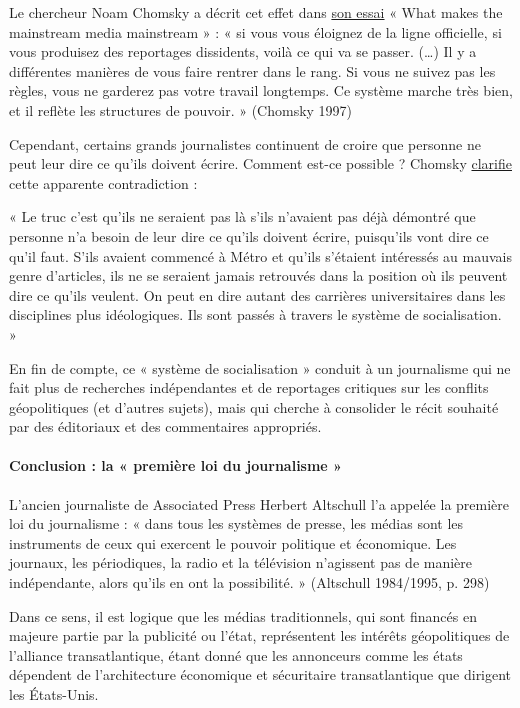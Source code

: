Le chercheur Noam Chomsky a décrit cet effet dans
\href{https://chomsky.info/199710__/}{son essai} « What makes the
mainstream media mainstream » : « si vous vous éloignez de la ligne
officielle, si vous produisez des reportages dissidents, voilà ce qui va
se passer. (\ldots{}) Il y a différentes manières de vous faire rentrer
dans le rang. Si vous ne suivez pas les règles, vous ne garderez pas
votre travail longtemps. Ce système marche très bien, et il reflète les
structures de pouvoir. » (Chomsky 1997)

Cependant, certains grands journalistes continuent de croire que
personne ne peut leur dire ce qu'ils doivent écrire. Comment est-ce
possible ? Chomsky \href{https://chomsky.info/199710__/}{clarifie} cette
apparente contradiction :

« Le truc c'est qu'ils ne seraient pas là s'ils n'avaient pas déjà
démontré que personne n'a besoin de leur dire ce qu'ils doivent écrire,
puisqu'ils vont dire ce qu'il faut. S'ils avaient commencé à Métro et
qu'ils s'étaient intéressés au mauvais genre d'articles, ils ne se
seraient jamais retrouvés dans la position où ils peuvent dire ce qu'ils
veulent. On peut en dire autant des carrières universitaires dans les
disciplines plus idéologiques. Ils sont passés à travers le système de
socialisation. »

En fin de compte, ce « système de socialisation » conduit à un
journalisme qui ne fait plus de recherches indépendantes et de
reportages critiques sur les conflits géopolitiques (et d'autres
sujets), mais qui cherche à consolider le récit souhaité par des
éditoriaux et des commentaires appropriés.

\hypertarget{conclusion--la--premiuxe8re-loi-du-journalisme-}{%
\paragraph{Conclusion : la « première loi du journalisme
»}\label{conclusion--la--premiuxe8re-loi-du-journalisme-}}

L'ancien journaliste de Associated Press Herbert Altschull l'a appelée
la première loi du journalisme : « dans tous les systèmes de presse, les
médias sont les instruments de ceux qui exercent le pouvoir politique et
économique. Les journaux, les périodiques, la radio et la télévision
n'agissent pas de manière indépendante, alors qu'ils en ont la
possibilité. » (Altschull 1984/1995, p. 298)

Dans ce sens, il est logique que les médias traditionnels, qui sont
financés en majeure partie par la publicité ou l'état, représentent les
intérêts géopolitiques de l'alliance transatlantique, étant donné que
les annonceurs comme les états dépendent de l'architecture économique et
sécuritaire transatlantique que dirigent les États-Unis.

